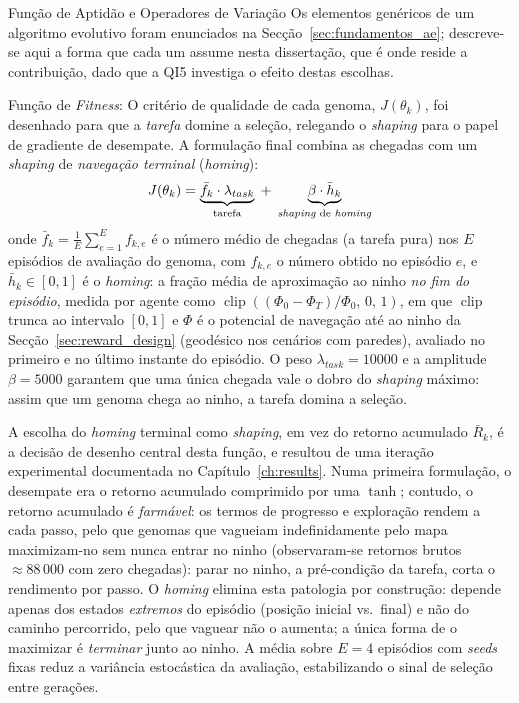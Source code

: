 \documentclass[12pt,reqno, twoside]{amsbook}
\makeatletter
\def\subsection{\@startsection{subsection}{2}%
      \z@{.5\linespacing\@plus.7\linespacing}{.25\linespacing}%
      {\normalfont\bfseries\flushleft}}
\def\paragraph{\@startsection{paragraph}{4}%
  \z@\z@{-\fontdimen2\font}%
  {\normalfont\bfseries}}
\theoremstyle{plain}
\numberwithin{equation}{chapter}
\numberwithin{section}{chapter}
\numberwithin{table}{chapter}
\numberwithin{figure}{chapter}
\makeatother
\begin{document}
\subsection{Função de Aptidão e Operadores de Variação}
\label{sec:evo_fitness}
Os elementos genéricos de um algoritmo evolutivo foram enunciados na Secção~\ref{sec:fundamentos_ae}; descreve-se aqui a forma que cada um assume nesta dissertação, que é onde reside a contribuição, dado que a QI5 investiga o efeito destas escolhas.

\paragraph{Função de \textit{Fitness}:}
O critério de qualidade de cada genoma, $J(\theta_k)$, foi desenhado para que a \emph{tarefa} domine a seleção, relegando o \textit{shaping} para o papel de gradiente de desempate. A formulação final combina as chegadas com um \textit{shaping} de \emph{navegação terminal} (\textit{homing}):
\begin{equation}
    J(\theta_k) = \underbrace{\bar{f}_k \cdot \lambda_{task}}_{\text{tarefa}} \;+\; \underbrace{\beta \cdot \bar{h}_k}_{\text{\textit{shaping} de \textit{homing}}}
    \label{eq:fitness}
\end{equation}
onde $\bar{f}_k = \frac{1}{E}\sum_{e=1}^{E} f_{k,e}$ é o número médio de chegadas (a tarefa pura) nos $E$ episódios de avaliação do genoma, com $f_{k,e}$ o número obtido no episódio $e$, e $\bar{h}_k \in [0,1]$ é o \textit{homing}: a fração média de aproximação ao ninho \emph{no fim do episódio}, medida por agente como $\operatorname{clip}\!\left((\Phi_0 - \Phi_T)/\Phi_0,\, 0,\, 1\right)$, em que $\operatorname{clip}$ trunca ao intervalo $[0,1]$ e $\Phi$ é o potencial de navegação até ao ninho da Secção~\ref{sec:reward_design} (geodésico nos cenários com paredes), avaliado no primeiro e no último instante do episódio. O peso $\lambda_{task}=10000$ e a amplitude $\beta=5000$ garantem que uma única chegada vale o dobro do \textit{shaping} máximo: assim que um genoma chega ao ninho, a tarefa domina a seleção.

A escolha do \textit{homing} terminal como \textit{shaping}, em vez do retorno acumulado $\bar{R}_k$, é a decisão de desenho central desta função, e resultou de uma iteração experimental documentada no Capítulo~\ref{ch:results}. Numa primeira formulação, o desempate era o retorno acumulado comprimido por uma $\tanh$; contudo, o retorno acumulado é \emph{farmável}: os termos de progresso e exploração rendem a cada passo, pelo que genomas que vagueiam indefinidamente pelo mapa maximizam-no sem nunca entrar no ninho (observaram-se retornos brutos $\approx 88\,000$ com zero chegadas): parar no ninho, a pré-condição da tarefa, corta o rendimento por passo. O \textit{homing} elimina esta patologia por construção: depende apenas dos estados \emph{extremos} do episódio (posição inicial vs.\ final) e não do caminho percorrido, pelo que vaguear não o aumenta; a única forma de o maximizar é \emph{terminar} junto ao ninho. A média sobre $E=4$ episódios com \textit{seeds} fixas reduz a variância estocástica da avaliação, estabilizando o sinal de seleção entre gerações.
\end{document}
